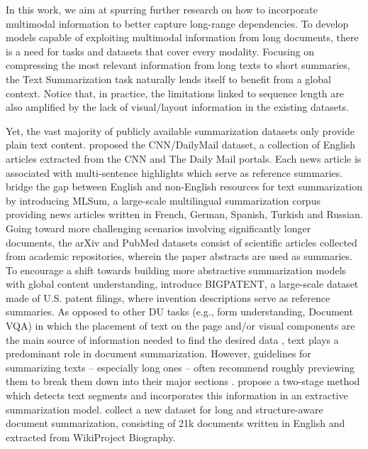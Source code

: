 In this work, we aim at spurring further research on how to incorporate multimodal information to better capture long-range dependencies. To develop models capable of exploiting multimodal information from long documents, there is a need for tasks and datasets that cover every modality. Focusing on compressing the most relevant information from long texts to short summaries, the Text Summarization task naturally lends itself to benefit from a global context. Notice that, in practice, the limitations linked to sequence length are also amplified by the lack of visual/layout information in the existing datasets. 

Yet, the vast majority of publicly available summarization datasets only provide plain text content. \citet{hermann2015teaching} proposed the CNN/DailyMail dataset, a collection of English articles extracted from the CNN and The Daily Mail portals. Each news article is associated with multi-sentence highlights which serve as reference summaries. \citet{scialom2020mlsum} bridge the gap between English and non-English resources for text summarization by introducing MLSum, a large-scale multilingual summarization corpus providing news articles written in French, German, Spanish, Turkish and Russian. Going toward more challenging scenarios involving significantly longer documents, the arXiv and PubMed datasets \citep{cohan2018discourse} consist of scientific articles collected from academic repositories, wherein the paper abstracts are used as summaries. To encourage a shift towards building more abstractive summarization models with global content understanding, \citet{sharma2019bigpatent} introduce BIGPATENT, a large-scale dataset made of U.S. patent filings, where invention descriptions serve as reference summaries. As opposed to other \ac{DU} tasks (e.g., form understanding, \ac{Document VQA}) in which the placement of text on the page and/or visual components are the main source of information needed to find the desired data \citep{borchmann2021due}, text plays a predominant role in document summarization. However, guidelines for summarizing texts -- especially long ones -- often recommend roughly previewing them to break them down into their major sections \citep{toprak2009three, luo2019reading}. \citet{miculicich2022document} propose a two-stage method which detects text segments and incorporates this information in an extractive summarization model. \citet{cao2022hibrids} collect a new dataset for long and structure-aware document summarization, consisting of 21k documents written in English and extracted from WikiProject Biography. 

